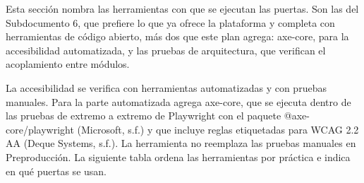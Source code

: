 \documentclass[formulario]{../../comun/overfore}
\begin{document}
Esta sección nombra las herramientas con que se ejecutan las puertas. Son las del Subdocumento 6, que prefiere lo que ya ofrece la plataforma y completa con herramientas de código abierto, más dos que este plan agrega: axe-core, para la accesibilidad automatizada, y las pruebas de arquitectura, que verifican el acoplamiento entre módulos.

La accesibilidad se verifica con herramientas automatizadas y con pruebas manuales. Para la parte automatizada agrega axe-core, que se ejecuta dentro de las pruebas de extremo a extremo de Playwright con el paquete @axe-core/playwright (Microsoft, s.f.) y que incluye reglas etiquetadas para WCAG 2.2 AA (Deque Systems, s.f.). La herramienta no reemplaza las pruebas manuales en Preproducción. La siguiente tabla ordena las herramientas por práctica e indica en qué puertas se usan.
\end{document}
